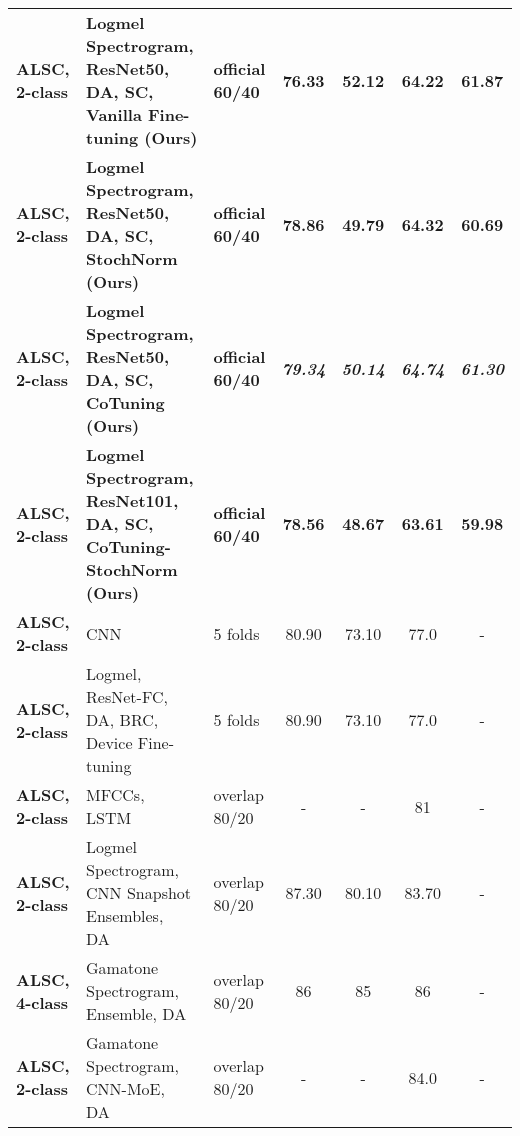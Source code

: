 \documentclass[journal]{IEEEtran}
\begin{document}
\begin{table*}[t]
{\begin{tabular}{l l l c c c c}
        \hline
        
        \textbf{ALSC, 2-class}   & \textbf{Logmel Spectrogram, ResNet50, DA, SC, Vanilla Fine-tuning (Ours)}   & \textbf{official 60/40}  & \textbf{76.33}  & \textbf{52.12}  & \textbf{64.22} & \textbf{61.87} \\
        \textbf{ALSC, 2-class}   & \textbf{Logmel Spectrogram, ResNet50, DA, SC, StochNorm (Ours)}   & \textbf{official 60/40}  & \textbf{78.86}  & \textbf{49.79}  & \textbf{64.32} & \textbf{60.69} \\
        \textbf{ALSC, 2-class}   & \textbf{Logmel Spectrogram, ResNet50, DA, SC, CoTuning (Ours)}   & \textbf{official 60/40}  & \textit{\textbf{79.34}}  & \textit{\textbf{50.14}}  & \textit{\textbf{64.74}} & \textit{\textbf{61.30}}\\
        \textbf{ALSC, 2-class}   & \textbf{Logmel Spectrogram, ResNet101, DA, SC, CoTuning-StochNorm (Ours)}   & \textbf{official 60/40}  & \textbf{78.56}  & \textbf{48.67}  & \textbf{63.61} & \textbf{59.98}\\
\textbf{ALSC, 2-class}   & CNN~\cite{gairola2020respirenet}  & 5 folds  & 80.90  & 73.10  & 77.0 & -\\
         \textbf{ALSC, 2-class}   & Logmel, ResNet-FC, DA, BRC, Device Fine-tuning~\cite{gairola2020respirenet}  & 5 folds  & 80.90  & 73.10  & 77.0 & -\\
         
        \textbf{ALSC, 2-class}   &  MFCCs, LSTM~\cite{dPerna2019lstm} & overlap 80/20  & -  & -  & 81  & -\\
         \textbf{ALSC, 2-class}   & Logmel Spectrogram, CNN Snapshot Ensembles, DA~\cite{nguyen2020lung}  & overlap 80/20  & 87.30  & 80.10  & 83.70 & -\\
         \textbf{ALSC, 4-class}   & Gamatone Spectrogram, Ensemble, DA~\cite{pham2020robust}  & overlap 80/20  & 86  & 85  & 86 & - \\
         \textbf{ALSC, 2-class}   & Gamatone Spectrogram, CNN-MoE, DA~\cite{pham2021cnn}  & overlap 80/20  & -  & -  & 84.0 & - \\
         \hline
    \end{tabular}
    }
\end{table*}
\end{document}
